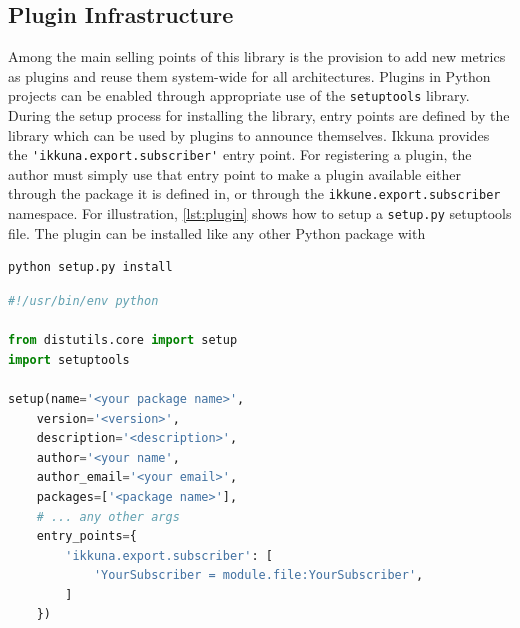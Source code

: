 \hypertarget{plugin-infrastructure}{%
\subsection{Plugin Infrastructure}\label{plugin-infrastructure}}

Among the main selling points of this library is the provision to add new
metrics as plugins and reuse them system-wide for all architectures. Plugins in
Python projects can be enabled through appropriate use of the
\texttt{setuptools} library. During the setup process for installing the
library, entry points are defined by the library which can be used by plugins to
announce themselves. Ikkuna provides the \lstinline{'ikkuna.export.subscriber'}
entry point. For registering a plugin, the author must simply use that entry
point to make a plugin available either through the package it is defined in, or
through the \lstinline{ikkune.export.subscriber} namespace. For illustration,
\cref{lst:plugin} shows how to setup a \texttt{setup.py} setuptools file. The
plugin can be installed like any other Python package with
\begin{lstlisting}[language=Python]
python setup.py install
\end{lstlisting}

\begin{lstlisting}[label=lst:plugin, language=Python, caption=Sample setup script for subscriber plugins]
#!/usr/bin/env python

from distutils.core import setup
import setuptools

setup(name='<your package name>',
    version='<version>',
    description='<description>',
    author='<your name',
    author_email='<your email>',
    packages=['<package name>'],
    # ... any other args
    entry_points={
        'ikkuna.export.subscriber': [
            'YourSubscriber = module.file:YourSubscriber',
        ]
    })
\end{lstlisting}
